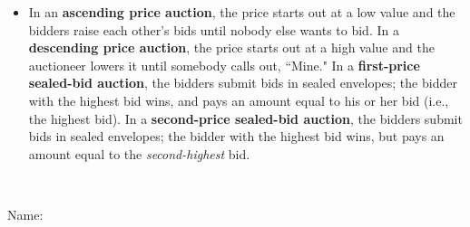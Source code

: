 \documentclass[twoside]{article}
\begin{document}
\begin{EXAM}
\begin{itemize}
\item In an \textbf{ascending price auction}, the price starts out at a low value and the bidders raise each other's bids until nobody else wants to bid. In a \textbf{descending price auction}, the price starts out at a high value and the auctioneer lowers it until somebody calls out, ``Mine." In a \textbf{first-price sealed-bid auction}, the bidders submit bids in sealed envelopes; the bidder with the highest bid wins, and pays an amount equal to his or her bid (i.e., the highest bid). In a \textbf{second-price sealed-bid auction}, the bidders submit bids in sealed envelopes; the bidder with the highest bid wins, but pays an amount equal to the \emph{second-highest} bid.
\end{itemize}

\ \clearpage

\vspace*{-3cm}
\begin{flushright}
Name: \hspace*{1in}
\bigskip
\end{flushright}


\end{EXAM}
\end{document}
